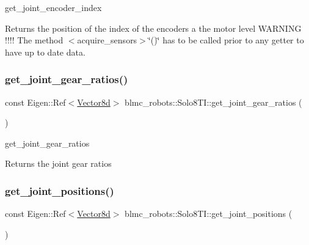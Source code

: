 get\+\_\+joint\+\_\+encoder\+\_\+index 

\begin{DoxyReturn}{Returns}
the position of the index of the encoders a the motor level W\+A\+R\+N\+I\+NG !!!! The method $<$acquire\+\_\+sensors$>$\char`\"{}()\char`\"{} has to be called prior to any getter to have up to date data. 
\end{DoxyReturn}
\mbox{\label{classblmc__robots_1_1Solo8TI_a9f8c700d0646d5cc7f7e884b17aef1ab}} 
\subsubsection{\texorpdfstring{get\+\_\+joint\+\_\+gear\+\_\+ratios()}{get\_joint\_gear\_ratios()}}
{\footnotesize\ttfamily const Eigen\+::\+Ref$<$\hyperlink{common__header_8hpp_a98975ffbe0bca1296078e0350dfedd60}{Vector8d}$>$ blmc\+\_\+robots\+::\+Solo8\+T\+I\+::get\+\_\+joint\+\_\+gear\+\_\+ratios (\begin{DoxyParamCaption}{ }\end{DoxyParamCaption})\hspace{0.3cm}{\ttfamily [inline]}}



get\+\_\+joint\+\_\+gear\+\_\+ratios 

\begin{DoxyReturn}{Returns}
the joint gear ratios 
\end{DoxyReturn}
\mbox{\label{classblmc__robots_1_1Solo8TI_ac9165114408f88accbaa151b797ed1b6}} 
\subsubsection{\texorpdfstring{get\+\_\+joint\+\_\+positions()}{get\_joint\_positions()}}
{\footnotesize\ttfamily const Eigen\+::\+Ref$<$\hyperlink{common__header_8hpp_a98975ffbe0bca1296078e0350dfedd60}{Vector8d}$>$ blmc\+\_\+robots\+::\+Solo8\+T\+I\+::get\+\_\+joint\+\_\+positions (\begin{DoxyParamCaption}{ }\end{DoxyParamCaption})\hspace{0.3cm}{\ttfamily [inline]}}



